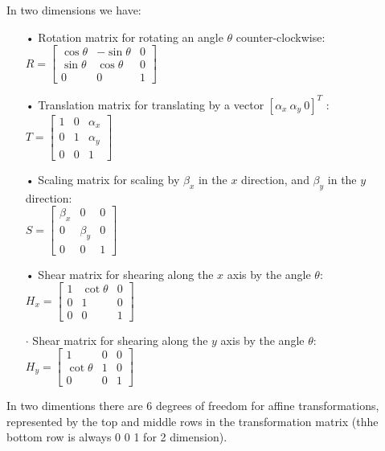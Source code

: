 \documentclass[13pt]{letter}
\begin{document}
\begin{enumerate}
	In two dimensions we have:
	\begin{enumerate}
		\item[•]	 Rotation matrix for rotating an angle $\theta$ counter-clockwise: \\
		$R = \left[
		\begin{array}{ccc}
			\cos	\theta & -\sin\theta  & 0 \\
			\sin\theta & \cos\theta   & 0 \\
			0          & 0            & 1
		\end{array}
		\right]$
		\item[•] Translation matrix for translating by a vector $[\alpha_x~\alpha_y~0]^T$ : \\
		$T = \left[
		\begin{array}{ccc}
			1 & 0 	& \alpha_x \\
			0 & 1 & \alpha_y \\
			0 & 0 & 1
		\end{array}
		\right]$
		\item[•] Scaling matrix for scaling by $\beta_x$ in the $x$ direction, and $\beta_y$ in the $y$ direction: \\
		$S = \left[
		\begin{array}{ccc}
			\beta_x & 0       & 0 \\
			0       & \beta_y & 0 \\
			0       & 0       & 1
		\end{array}
		\right]$
		\item[•] Shear matrix for shearing along the $x$ axis by the angle $\theta$: \\
		$H_x = \left[
		\begin{array}{ccc}
			1 & \cot\theta & 0 \\
			0 & 1          & 0 \\
			0 & 0          & 1
		\end{array}
		\right]$	
		\item[$\cdot$] Shear matrix for shearing along the $y$ axis by the angle $\theta$: \\
		$H_y = \left[
		\begin{array}{ccc}
			1          & 0 & 0 \\
			\cot\theta & 1 & 0 \\
			0          & 0 & 1
		\end{array}
		\right]$	
	\end{enumerate}
	
	In two dimentions there are 6 degrees of freedom for affine transformations, represented by the top and middle rows in the transformation matrix (thhe bottom row is always 0 0 1 for 2 dimension).
	

\end{enumerate}
\end{document}
